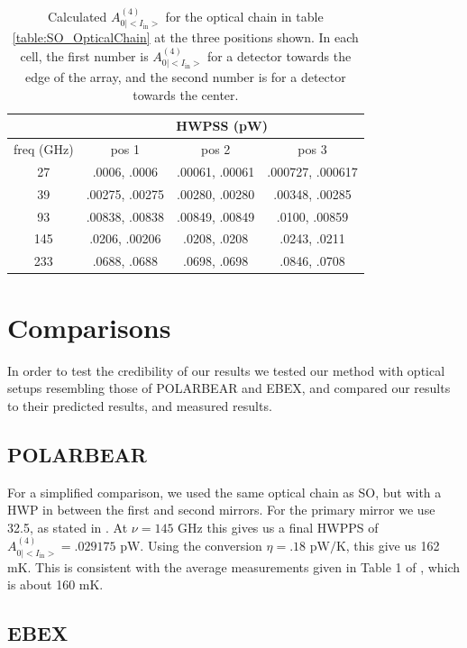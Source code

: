 \documentclass{article}
\theoremstyle{remark}
\newcommand{\tab}{\hspace*{2em}}
\renewcommand{\t}[1]{\text{#1}}
\newcommand{\AI}{A^{(4)}_{0|<I_{\t{in}}>}}
\begin{document}
\begin{table}
\begin{center}
\begin{tabular}{ |c|c|c|c| } 
	\hline
	 & \multicolumn{3}{|c|}{HWPSS (pW)}\\
	\hline
	freq (GHz) & pos 1 	& pos 2 & pos 3 \\ \hline
	27  & .0006, .0006 	 & .00061, .00061 & .000727, .000617 \\
	39  & .00275, .00275 & .00280, .00280 & .00348, .00285	 \\
	93  & .00838, .00838 & .00849, .00849 & .0100, .00859 	 \\
	145 & .0206, .00206  & .0208, .0208   & .0243, .0211 	 \\
	233 & .0688, .0688   & .0698, .0698   & .0846, .0708 	 \\
	\hline	
\end{tabular}
\end{center}
\caption{ Calculated $\AI$ for the optical chain in table \ref{table:SO_OpticalChain} at the three positions shown.
In each cell, the first number is $\AI$ for a detector towards the edge of the array, and the second number 
is for a detector towards the center. }
\label{table:SO_powers}
\end{table}




\section*{Comparisons}

\tab In order to test the credibility of our results we tested our method with optical setups resembling those of POLARBEAR and EBEX,
and compared our results to their predicted results, and measured results. 

\subsection*{POLARBEAR}
\tab For a simplified comparison, we used the same optical chain as SO, but with a HWP in between the first and second mirrors.
For the primary mirror we use 32.5\degree, as stated in \cite{takakura_performance_2017}. At $\nu = 145 \t{ GHz}$ this gives us a final 
HWPPS of $\AI = .029175 \t{ pW}$. Using the conversion $\eta = .18 \t{ pW/K}$, this give us 162 mK.
This is consistent with the average measurements given in Table 1 of \cite{takakura_performance_2017}, which is about 160 mK.

\subsection*{EBEX}
\end{document}
